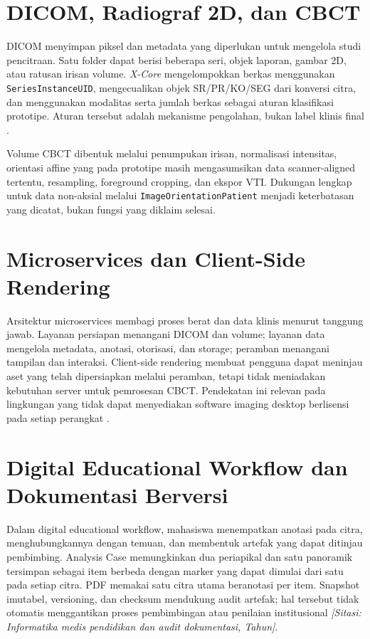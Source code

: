 \documentclass[12pt,a4paper,oneside]{report}
\newcommand{\sitasi}[1]{\textit{[Sitasi: #1]}}
\newcommand{\xcore}{\textit{X-Core}}
\begin{document}
\section{DICOM, Radiograf 2D, dan CBCT}
DICOM menyimpan piksel dan metadata yang diperlukan untuk mengelola studi pencitraan. Satu folder dapat berisi beberapa seri, objek laporan, gambar 2D, atau ratusan irisan volume. \xcore{} mengelompokkan berkas menggunakan \texttt{SeriesInstanceUID}, mengecualikan objek SR/PR/KO/SEG dari konversi citra, dan menggunakan modalitas serta jumlah berkas sebagai aturan klasifikasi prototipe. Aturan tersebut adalah mekanisme pengolahan, bukan label klinis final \cite{ref:dicom}.

Volume CBCT dibentuk melalui penumpukan irisan, normalisasi intensitas, orientasi affine yang pada prototipe masih mengasumsikan data scanner-aligned tertentu, resampling, foreground cropping, dan ekspor VTI. Dukungan lengkap untuk data non-aksial melalui \texttt{ImageOrientationPatient} menjadi keterbatasan yang dicatat, bukan fungsi yang diklaim selesai.

\section{Microservices dan Client-Side Rendering}
Arsitektur microservices membagi proses berat dan data klinis menurut tanggung jawab. Layanan persiapan menangani DICOM dan volume; layanan data mengelola metadata, anotasi, otorisasi, dan storage; peramban menangani tampilan dan interaksi. Client-side rendering membuat pengguna dapat meninjau aset yang telah dipersiapkan melalui peramban, tetapi tidak meniadakan kebutuhan server untuk pemrosesan CBCT. Pendekatan ini relevan pada lingkungan yang tidak dapat menyediakan software imaging desktop berlisensi pada setiap perangkat \cite{ref:nascimento2023,ref:owolabi2022}.

\section{Digital Educational Workflow dan Dokumentasi Berversi}
Dalam digital educational workflow, mahasiswa menempatkan anotasi pada citra, menghubungkannya dengan temuan, dan membentuk artefak yang dapat ditinjau pembimbing. Analysis Case memungkinkan dua periapikal dan satu panoramik tersimpan sebagai item berbeda dengan marker yang dapat dimulai dari satu pada setiap citra. PDF memakai satu citra utama beranotasi per item. Snapshot imutabel, versioning, dan checksum mendukung audit artefak; hal tersebut tidak otomatis menggantikan proses pembimbingan atau penilaian institusional \sitasi{Informatika medis pendidikan dan audit dokumentasi, Tahun}.
\end{document}
